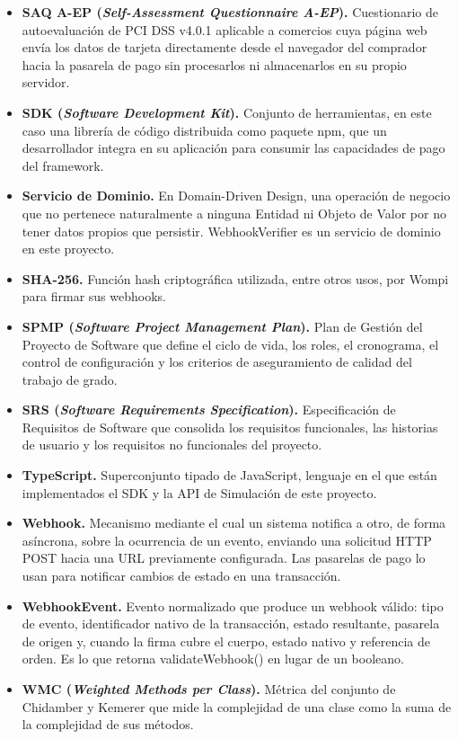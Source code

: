 \begin{itemize}
    \item \textbf{SAQ A-EP (\textit{Self-Assessment Questionnaire A-EP}).} Cuestionario de autoevaluación de PCI DSS v4.0.1 aplicable a comercios cuya página web envía los datos de tarjeta directamente desde el navegador del comprador hacia la pasarela de pago sin procesarlos ni almacenarlos en su propio servidor.
    \item \textbf{SDK (\textit{Software Development Kit}).} Conjunto de herramientas, en este caso una librería de código distribuida como paquete npm, que un desarrollador integra en su aplicación para consumir las capacidades de pago del framework.
    \item \textbf{Servicio de Dominio.} En Domain-Driven Design, una operación de negocio que no pertenece naturalmente a ninguna Entidad ni Objeto de Valor por no tener datos propios que persistir. WebhookVerifier es un servicio de dominio en este proyecto.
    \item \textbf{SHA-256.} Función hash criptográfica utilizada, entre otros usos, por Wompi para firmar sus webhooks.
    \item \textbf{SPMP (\textit{Software Project Management Plan}).} Plan de Gestión del Proyecto de Software que define el ciclo de vida, los roles, el cronograma, el control de configuración y los criterios de aseguramiento de calidad del trabajo de grado.
    \item \textbf{SRS (\textit{Software Requirements Specification}).} Especificación de Requisitos de Software que consolida los requisitos funcionales, las historias de usuario y los requisitos no funcionales del proyecto.
    \item \textbf{TypeScript.} Superconjunto tipado de JavaScript, lenguaje en el que están implementados el SDK y la API de Simulación de este proyecto.
    \item \textbf{Webhook.} Mecanismo mediante el cual un sistema notifica a otro, de forma asíncrona, sobre la ocurrencia de un evento, enviando una solicitud HTTP POST hacia una URL previamente configurada. Las pasarelas de pago lo usan para notificar cambios de estado en una transacción.
    \item \textbf{WebhookEvent.} Evento normalizado que produce un webhook válido: tipo de evento, identificador nativo de la transacción, estado resultante, pasarela de origen y, cuando la firma cubre el cuerpo, estado nativo y referencia de orden. Es lo que retorna validateWebhook() en lugar de un booleano.
    \item \textbf{WMC (\textit{Weighted Methods per Class}).} Métrica del conjunto de Chidamber y Kemerer que mide la complejidad de una clase como la suma de la complejidad de sus métodos.
\end{itemize}

